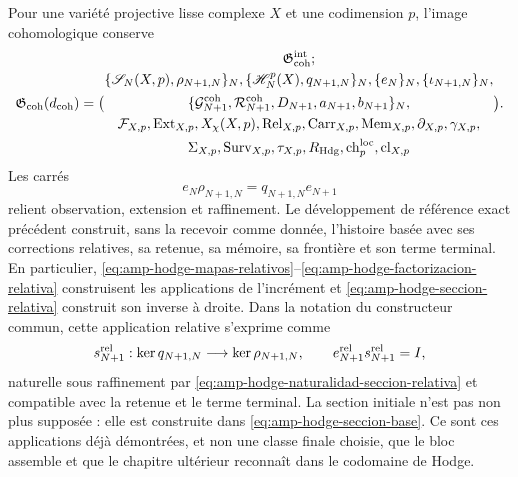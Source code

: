 Pour une variété projective lisse complexe $X$ et une codimension $p$, l’image cohomologique conserve
\begin{equation}\label{eq:pdf2-g-coh-explicito}
 \mathfrak G_{\rm coh}(d_{\rm coh})=
 \bigl(
 \begin{gathered}
  \mathfrak G_{\rm coh}^{\rm int};\\
  \{\mathscr S_N(X,p),\rho_{N+1,N}\}_N,
  \{\mathscr H_N^p(X),q_{N+1,N}\}_N,
  \{e_N\}_N,
  \{\iota_{N+1,N}\}_N,\\
  \{\mathcal G_{N+1}^{\rm coh},\mathcal R_{N+1}^{\rm coh},
       D_{N+1},a_{N+1},b_{N+1}\}_N,\\
  \mathcal F_{X,p},\operatorname{Ext}_{X,p},X_\chi(X,p),
  \operatorname{Rel}_{X,p},\operatorname{Carr}_{X,p},
  \operatorname{Mem}_{X,p},\partial_{X,p},\gamma_{X,p},\\
  \Sigma_{X,p},\operatorname{Surv}_{X,p},\tau_{X,p},
  R_{\rm Hdg},\operatorname{ch}^{\rm loc}_p,\operatorname{cl}_{X,p}
 \end{gathered}
 \bigr).
\end{equation}
Les carrés
\begin{equation}\label{eq:pdf2-g-coh-cuadrados}
 e_N\rho_{N+1,N}=q_{N+1,N}e_{N+1}
\end{equation}
relient observation, extension et raffinement. Le développement de référence exact précédent construit, sans la recevoir comme donnée, l’histoire basée avec ses corrections relatives, sa retenue, sa mémoire, sa frontière et son terme terminal. En particulier, \eqref{eq:amp-hodge-mapas-relativos}--\eqref{eq:amp-hodge-factorizacion-relativa} construisent les applications de l’incrément et \eqref{eq:amp-hodge-seccion-relativa} construit son inverse à droite. Dans la notation du constructeur commun, cette application relative s’exprime comme
\begin{equation}\label{eq:pdf2-g-coh-seccion-dato}
 s_{N+1}^{\rm rel}:\ker q_{N+1,N}\longrightarrow\ker\rho_{N+1,N},
 \qquad
 e_{N+1}^{\rm rel}s_{N+1}^{\rm rel}=I,
\end{equation}
naturelle sous raffinement par \eqref{eq:amp-hodge-naturalidad-seccion-relativa} et compatible avec la retenue et le terme terminal. La section initiale n’est pas non plus supposée : elle est construite dans \eqref{eq:amp-hodge-seccion-base}. Ce sont ces applications déjà démontrées, et non une classe finale choisie, que le bloc assemble et que le chapitre ultérieur reconnaît dans le codomaine de Hodge.

